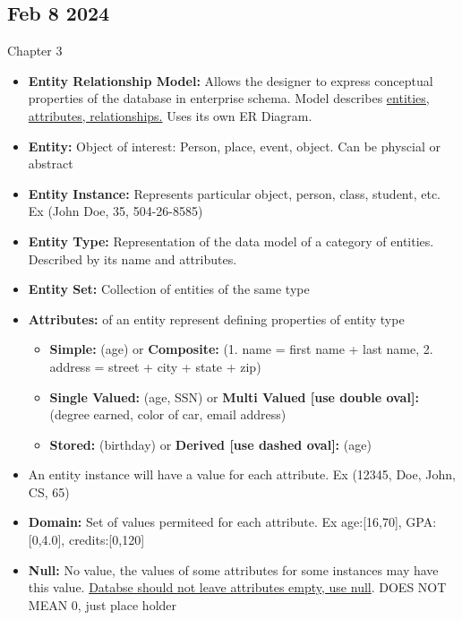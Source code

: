 \documentclass[12pt]{article}
\begin{document}
\subsection*{Feb 8 2024}

Chapter 3

\begin{itemize}
		  \item \textbf{Entity Relationship Model:} Allows the designer to express conceptual properties
					 of the database in enterprise schema. Model describes 
					 \underline{entities, attributes, relationships.}
					 Uses its own ER Diagram.
		  \item \textbf{Entity:} Object of interest: Person, place, event, object. Can be physcial or abstract
		  \item \textbf{Entity Instance:} Represents particular object, person, class, student, etc.
					 Ex (John Doe, 35, 504-26-8585)
		  \item \textbf{Entity Type:} Representation of the data model of a category of entities. Described
					 by its name and attributes. 
		  \item \textbf{Entity Set:} Collection of entities of the same type
		  \item \textbf{Attributes:} of an entity represent defining properties of entity type
					 \begin{itemize}
								\item \textbf{Simple:} (age) or \textbf{Composite:} (1. name = first name + last name, 
										 2. address = street + city + state + zip)
							   \item \textbf{Single Valued:} (age, SSN) or \textbf{Multi Valued [use double oval]:}
										  (degree earned, color of car, email address)
								\item \textbf{Stored:} (birthday) or \textbf{Derived [use dashed oval]:}
										  (age)
					 \end{itemize}
		  \item An entity instance will have a value for each attribute. Ex (12345, Doe, John, CS, 65)
		  \item \textbf{Domain:} Set of values permiteed for each attribute. Ex age:[16,70],
					 GPA:[0,4.0], credits:[0,120]
		  \item \textbf{Null:} No value, the values of some attributes for some instances may have this value.
					 \underline{Databse should not leave attributes empty, use null}. DOES NOT MEAN 0, just 
					 place holder
\end{itemize}
\end{document}
